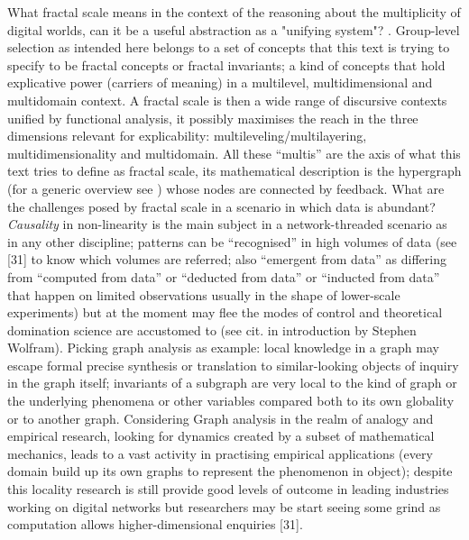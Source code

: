 \documentclass[14pt]{extarticle}
\begin{document}
\hspace*{15mm}What fractal scale means in the context of the reasoning about the multiplicity of digital worlds, can it be a useful abstraction as a "unifying system"?  \cite{SLOANdarwin}. Group-level selection as intended here belongs to a set of concepts that this text is trying to specify to be fractal concepts or fractal invariants; a kind of concepts that hold explicative power (carriers of meaning) in a multilevel, multidimensional and multidomain context. A fractal scale is then a wide range of discursive contexts unified by functional analysis, it possibly maximises the reach in the three dimensions relevant for explicability: multileveling/multilayering, multidimensionality and multidomain. All these “multis” are the axis of what this text tries to define as fractal scale, its mathematical description is the hypergraph (for a generic overview see \cite{QuantaGraphs}) whose nodes are connected by feedback.
\newline
What are the challenges posed by fractal scale in a scenario in which data is abundant?
\newline
\hspace*{15mm}\textit{Causality} in non-linearity is the main subject in a network-threaded scenario as in any other discipline; patterns can be “recognised” in high volumes of data (see [31] to know which volumes are referred; also “emergent from data” as differing from “computed from data” or “deducted from data” or “inducted from data” that happen on limited observations usually in the shape of lower-scale experiments) but at the moment may flee the modes of control and theoretical domination science are accustomed to (see cit. in introduction by Stephen Wolfram).
\newline
Picking graph analysis as example: local knowledge in a graph may escape formal precise synthesis or translation to similar-looking objects of inquiry in the graph itself; invariants of a subgraph are very local to the kind of graph or the underlying phenomena or other variables compared both to its own globality or to another graph. Considering Graph analysis in the realm of analogy and empirical research, looking for dynamics created by a subset of mathematical mechanics, leads to a vast activity in practising empirical applications (every domain build up its own graphs to represent the phenomenon in object); despite this locality research is still provide good levels of outcome in leading industries working on digital networks but researchers may be start seeing some grind as computation allows higher-dimensional enquiries [31].
\end{document}

